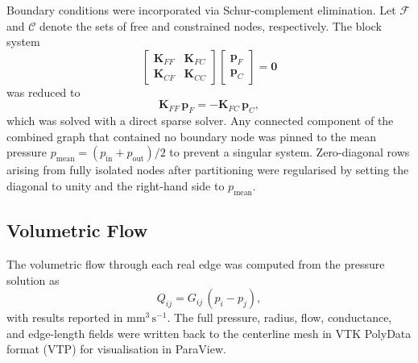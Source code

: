 \documentclass[11pt]{article}
\begin{document}
Boundary conditions were incorporated via Schur-complement elimination.  Let
$\mathcal{F}$ and $\mathcal{C}$ denote the sets of free and constrained nodes,
respectively.  The block system
%
\begin{equation}
  \begin{bmatrix} \mathbf{K}_{FF} & \mathbf{K}_{FC} \\
                  \mathbf{K}_{CF} & \mathbf{K}_{CC} \end{bmatrix}
  \begin{bmatrix} \mathbf{p}_F \\ \mathbf{p}_C \end{bmatrix}
  = \mathbf{0}
\end{equation}
%
was reduced to
%
\begin{equation}
  \mathbf{K}_{FF}\,\mathbf{p}_F = -\mathbf{K}_{FC}\,\mathbf{p}_C,
  \label{eq:schur}
\end{equation}
%
which was solved with a direct sparse solver.  Any connected component of the
combined graph that contained no boundary node was pinned to the mean pressure
$p_\mathrm{mean} = (p_\mathrm{in} + p_\mathrm{out})/2$ to prevent a singular
system.  Zero-diagonal rows arising from fully isolated nodes after partitioning
were regularised by setting the diagonal to unity and the right-hand side to
$p_\mathrm{mean}$.

\subsection{Volumetric Flow}

The volumetric flow through each real edge was computed from the pressure
solution as
%
\begin{equation}
  Q_{ij} = G_{ij}\,(p_i - p_j),
\end{equation}
%
with results reported in $\mathrm{mm^3\,s^{-1}}$.  The full pressure, radius,
flow, conductance, and edge-length fields were written back to the centerline
mesh in VTK PolyData format (VTP) for visualisation in ParaView.



\end{document}
